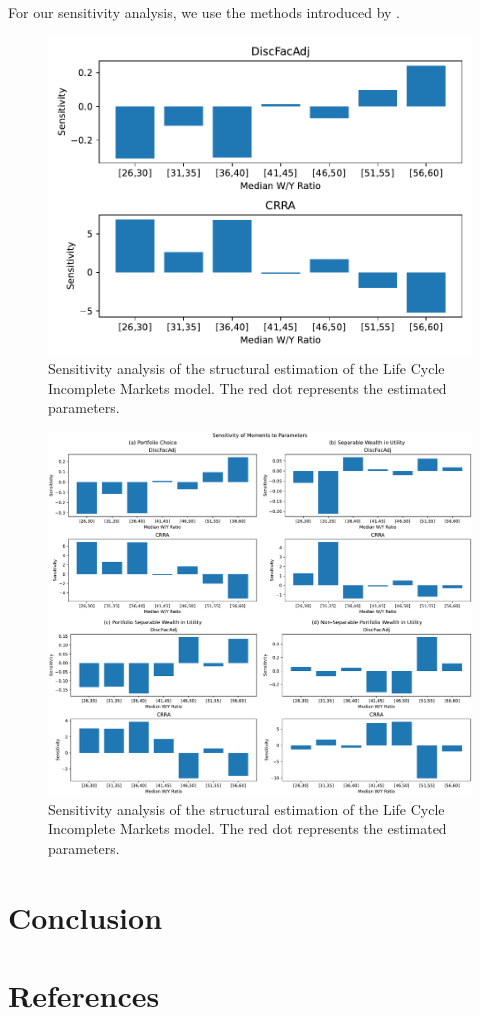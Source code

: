 \documentclass{article}
\begin{document}
For our sensitivity analysis, we use the methods introduced by \cite{Andrews_2017}.

\begin{figure}[!htbp]
\centering
\includegraphics[width=0.7\linewidth]{files/IndShockSensitivity-9046783d8c17a2fc3e39f5fb5ebcf6c7.pdf}
\caption{Sensitivity analysis of the structural estimation of the Life Cycle Incomplete Markets model. The red dot represents the estimated parameters.}
\label{fig:IndShockSensitivity}
\end{figure}

\begin{figure}[!htbp]
\centering
\includegraphics[width=0.7\linewidth]{files/AllSensitivity-0f14236654de527c752f26a13f644a4c.pdf}
\caption{Sensitivity analysis of the structural estimation of the Life Cycle Incomplete Markets model. The red dot represents the estimated parameters.}
\label{fig:AllSensitivity}
\end{figure}

\section{Conclusion}\label{Conclusion}

\section{References}\label{References}

\cite{Palumbo_1999}
\cite{Carroll_2000}
\cite{Carroll_1998}
\cite{Michaillat_2021}
\cite{Auclert_2021}
\cite{Mian_2020}
\cite{Kaplan_2018}
\cite{Auclert_2020}
\cite{Cagetti_2003}
\cite{Andrews_2017}
\cite{Attanasio_1999}  





\end{document}
